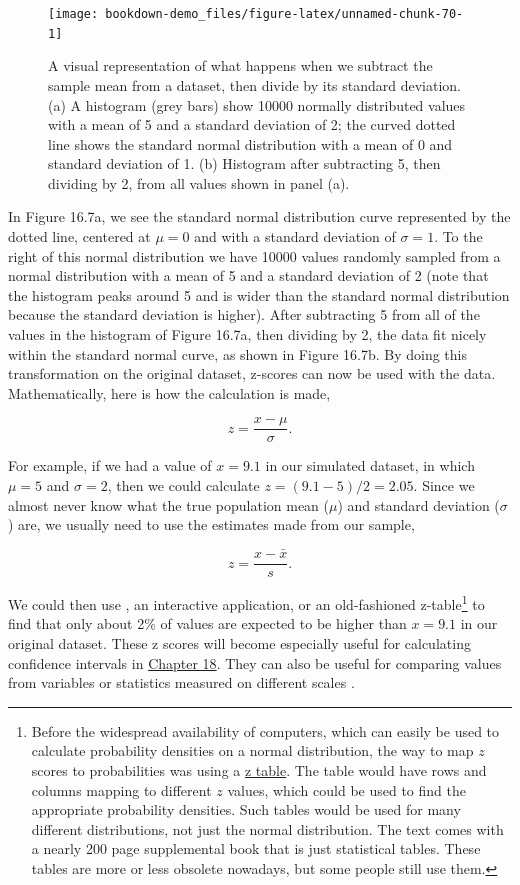 \documentclass[
]{scrbook}
\begin{document}
\begin{figure}
\texttt{[image: bookdown-demo\_files/figure-latex/unnamed-chunk-70-1]} \caption{A visual representation of what happens when we subtract the sample mean from a dataset, then divide by its standard deviation. (a) A histogram (grey bars) show 10000 normally distributed values with a mean of 5 and a standard deviation of 2; the curved dotted line shows the standard normal distribution with a mean of 0 and standard deviation of 1. (b) Histogram after subtracting 5, then dividing by 2, from all values shown in panel (a).}\label{fig:unnamed-chunk-70}
\end{figure}

In Figure 16.7a, we see the standard normal distribution curve represented by the dotted line, centered at \(\mu = 0\) and with a standard deviation of \(\sigma = 1\).
To the right of this normal distribution we have 10000 values randomly sampled from a normal distribution with a mean of 5 and a standard deviation of 2 (note that the histogram peaks around 5 and is wider than the standard normal distribution because the standard deviation is higher).
After subtracting 5 from all of the values in the histogram of Figure 16.7a, then dividing by 2, the data fit nicely within the standard normal curve, as shown in Figure 16.7b.
By doing this transformation on the original dataset, z-scores can now be used with the data.
Mathematically, here is how the calculation is made,

\[z = \frac{x - \mu}{\sigma}.\]

For example, if we had a value of \(x = 9.1\) in our simulated dataset, in which \(\mu = 5\) and \(\sigma = 2\), then we could calculate \(z = (9.1 - 5) / 2 = 2.05\).
Since we almost never know what the true population mean (\(\mu\)) and standard deviation (\(\sigma\)) are, we usually need to use the estimates made from our sample,

\[z = \frac{x - \bar{x}}{s}.\]

We could then use \citep{Jamovi2022}, an interactive application, or an old-fashioned z-table\footnote{Before the widespread availability of computers, which can easily be used to calculate probability densities on a normal distribution, the way to map \(z\) scores to probabilities was using a \href{https://www.z-table.com/}{z table}. The table would have rows and columns mapping to different \(z\) values, which could be used to find the appropriate probability densities. Such tables would be used for many different distributions, not just the normal distribution. The text \citet{Sokal1995} comes with a nearly 200 page supplemental book that is just statistical tables. These tables are more or less obsolete nowadays, but some people still use them.} to find that only about 2\% of values are expected to be higher than \(x = 9.1\) in our original dataset.
These z scores will become especially useful for calculating confidence intervals in \protect\hyperlink{Chapter_18}{Chapter 18}.
They can also be useful for comparing values from variables or statistics measured on different scales \citep{Sokal1995, Cheadle2003, Adams2016}.
\end{document}
